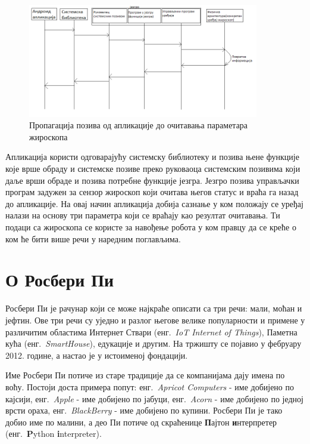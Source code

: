 \documentclass[12pt,oneside]{memoir}
\theoremstyle{remark}
\begin{document}
\begin{figure}[!ht]
\centering
\includegraphics[width=0.9\textwidth]{slike/propagacija_poziva.png}
\caption{Пропагација позива од апликације до очитавања параметара жироскопа}
\label{fig:propagacija}
\end{figure}

Апликација користи одговарајућу системску библиотеку и позива њене функције које врше обраду и системске позиве преко руковаоца системским позивима који даље врши обраде и позива потребне функције језгра. Језгро позива управљачки програм задужен за сензор жироскоп који очитава његов статус и враћа га назад до апликације. На овај начин апликација добија сазнање у ком положају се уређај налази на основу три параметра који се враћају као резултат очитавања. Ти подаци са жироскопа се користе за навођење робота у ком правцу да се креће о ком ће бити више речи у наредним поглављима.

\chapter{О Росбери Пи}
\label{chp:rpi}
Росбери Пи је рачунар који се може најкраће описати са три речи: мали, моћан и јефтин. Ове три речи су уједно и разлог његове велике популарности и примене у различитим областима Интернет Ствари (енг.~{\em IoT Internet of Things}), Паметна кућа (енг.~{\em SmartHouse}), едукације и другим.
На тржишту се појавио у фебруару 2012. године, а настао је у истоименој фондацији.

Име Росбери Пи потиче из старе традиције да се компанијама дају имена по воћу. Постоји доста примера попут: енг.~{\em Apricot Computers} - име добијено по кајсији, енг.~{\em Apple} - име добијено по јабуци, енг.~{\em Acorn} - име добијено по једној врсти ораха, енг.~{\em BlackBerry} - име добијено по купини. Росбери Пи је тако добио име по малини, а део Пи потиче од скраћенице \textbf{П}ајтон \textbf{и}нтерпретер (енг.~\textbf{P}ython \textbf{i}nterpreter).
\end{document}
